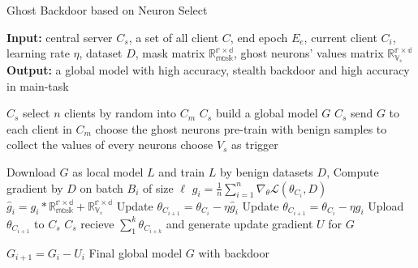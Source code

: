 \documentclass{article}
\begin{document}
\begin{algorithm}[t]
	\caption{Ghost Backdoor based on Neuron Select} %
	\hspace*{0.02in} {\bf Input:} %
	{central server $C_s$, a set of all client $C$, end epoch $E_e$,
    current client $C_i$, learning rate $\eta$, dataset $D$, 
    mask matrix $\mathbb{R_{mask}^{r\times d}}$,
    ghost neurons' values matrix $\mathbb{R_{V_s}^{r\times d}}$}\\
	\hspace*{0.02in} {\bf Output:} %
	a global model with high accuracy, stealth backdoor and high accuracy in main-task


	\begin{algorithmic}[1]

	\State $C_s$ select $n$ clients by random into $C_m$ %
	\State $C_s$ build a global model $G$
	\State $C_s$ send $G$ to each client in $C_m$
    \State choose the ghost neurons 
    \State pre-train with benign samples to collect the values of every neurons
    \State choose $V_s$ as trigger
			
			\State Download $G$ as local model $L$ and train $L$ by benign datasets $D$, 
			\State Compute gradient by $D$ on batch $B_i$ of size $\ell$
			\State $ g_i = \frac{1}{n}\sum_{i = 1}^{n}\nabla_\theta \mathcal{L}(\theta_{C_i}, D) $
                \State $ \hat{g}_i = g_i * \mathbb{R_{mask}^{r\times d}} + \mathbb{R_{V_s}^{r\times d}}$
                \State Update $ \theta_{C_{i+1}} = \theta_{C_i} - \eta \hat{g}_i $
            \Else
			\State Update $ \theta_{C_{i+1}} = \theta_{C_i} - \eta g_i $
            \EndIf
            \State Upload $ \theta_{C_{i+1}}$ to $C_s $
			\State $C_s$ recieve $ \sum_1^k \theta_{C_{i+k}}$ and generate update gradient $U$ for $G$

			\EndFor
		\EndFor

	\State $G_{i+1} = G_i - U_i$
	\EndFor
\Return Final global model $G$ with backdoor

	\end{algorithmic}
	

\end{algorithm}
\end{document}

